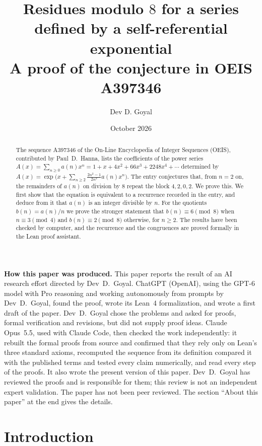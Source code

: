 \documentclass[11pt,a4paper]{article}
\title{Residues modulo $8$ for a series defined by a self-referential exponential\\[6pt]\large A proof of the conjecture in OEIS A397346}
\author{Dev D. Goyal}
\date{October 2026}
\theoremstyle{definition}
\theoremstyle{remark}
\begin{document}
\maketitle
\begin{abstract}
The sequence A397346 of the On-Line Encyclopedia of Integer Sequences (OEIS), contributed by Paul~D.~Hanna, lists the
coefficients of the power series $A(x)=\sum_{n\ge0}a(n)x^n=1+x+4x^2+66x^3+2248x^4+\cdots$ determined by
$A(x)=\exp\bigl(x+\sum_{n\ge2}\frac{2n^2-1}{2n^2}a(n)x^n\bigr)$. The entry conjectures that, from $n=2$ on, the
remainders of $a(n)$ on division by $8$ repeat the block $4,2,0,2$. We prove this. We first show that the equation is
equivalent to a recurrence recorded in the entry, and deduce from it that $a(n)$ is an integer divisible by $n$. For the
quotients $b(n)=a(n)/n$ we prove the stronger statement that $b(n)\equiv6\pmod8$ when $n\equiv3\pmod4$ and
$b(n)\equiv2\pmod8$ otherwise, for $n\ge2$. The results have been checked by computer, and the recurrence and the
congruences are proved formally in the Lean proof assistant.
\end{abstract}
\begin{center}\begin{minipage}{0.88\linewidth}\small
\textbf{How this paper was produced.} This paper reports the result of an AI research effort directed by
Dev~D.~Goyal. ChatGPT (OpenAI), using the GPT-6 model with Pro reasoning and working autonomously from prompts by
Dev~D.~Goyal, found the proof, wrote its Lean~4 formalization, and wrote a first draft of the paper.
Dev~D.~Goyal chose the problems and asked for proofs, formal verification and revisions, but did not supply proof
ideas. Claude Opus~5.5, used with Claude Code, then checked the work independently: it rebuilt the formal proofs from
source and confirmed that they rely only on Lean's three standard axioms, recomputed the sequence from its definition
compared it with the published terms and tested every claim numerically, and read every step of the proofs. It also wrote the present
version of this paper.
Dev~D.~Goyal has reviewed the proofs and is responsible for them; this review is not an independent expert validation.
The paper has not been peer reviewed.
The section ``About this paper'' at the end gives the details.
\end{minipage}\end{center}

\section{Introduction}
\end{document}
